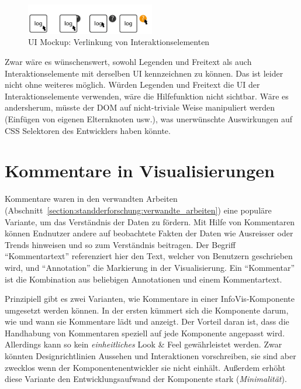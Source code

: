 \documentclass[
	headsepline,
	footsepline,
	fontsize=12pt,
	bibliography=totoc
]{scrbook}
\begin{document}
\begin{figure}[htbp]
   \centering
   \includegraphics[width=0.5\textwidth]{images/konzeption-verlinkung-bedienung.png}
   \caption{UI Mockup: Verlinkung von Interaktionselementen}
   \label{figure:verlinkung-bedienung}
\end{figure}

Zwar wäre es wünschenswert, sowohl Legenden und Freitext als auch Interaktionselemente mit derselben UI kennzeichnen zu können. Das ist leider nicht ohne weiteres möglich. Würden Legenden und Freitext die UI der Interaktionselemente verwenden, wäre die Hilfefunktion nicht sichtbar. Wäre es andersherum, müsste der DOM auf nicht-triviale Weise manipuliert werden (Einfügen von eigenen Elternknoten usw.), was unerwünschte Auswirkungen auf CSS Selektoren des Entwicklers haben könnte.

\section{Kommentare in Visualisierungen}
\label{section:konzeption:kommentare}


Kommentare waren in den verwandten Arbeiten (Abschnitt~\ref{section:standderforschung:verwandte_arbeiten}) eine populäre Variante, um das Verständnis der Daten zu fördern. Mit Hilfe von Kommentaren können Endnutzer andere auf beobachtete Fakten der Daten wie Ausreisser oder Trends hinweisen und so zum Verständnis beitragen. Der Begriff \enquote{Kommentartext} referenziert hier den Text, welcher von Benutzern geschrieben wird, und \enquote{Annotation} die Markierung in der Visualisierung. Ein \enquote{Kommentar} ist die Kombination aus beliebigen Annotationen und einem Kommentartext.


Prinzipiell gibt es zwei Varianten, wie Kommentare in einer InfoVis-Komponente umgesetzt werden können. In der ersten kümmert sich die Komponente darum, wie und wann sie Kommentare lädt und anzeigt. Der Vorteil daran ist, dass die Handhabung von Kommentaren speziell auf jede Komponente angepasst wird. Allerdings kann so kein \emph{einheitliches} Look \& Feel gewährleistet werden. Zwar könnten Designrichtlinien Aussehen und Interaktionen vorschreiben, sie sind aber zwecklos wenn der Komponentenentwickler sie nicht einhält. Außerdem erhöht diese Variante den Entwicklungsaufwand der Komponente stark (\emph{Minimalität}).
\end{document}
